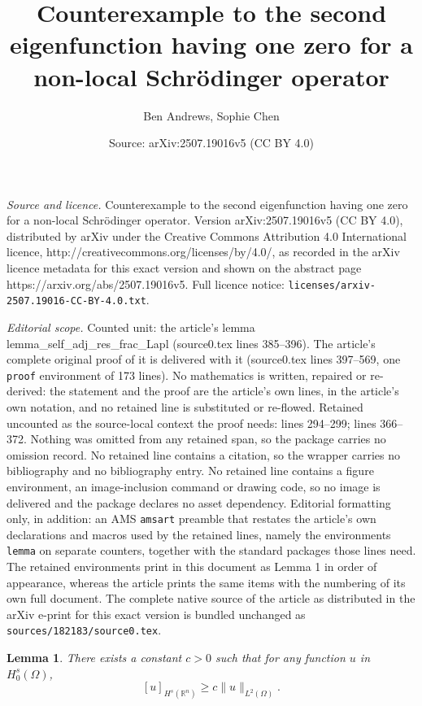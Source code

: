 \documentclass[10pt,a4paper]{amsart}
\title{Counterexample to the second eigenfunction having one zero for a non-local Schr\"{o}dinger operator}
\author{Ben Andrews, Sophie Chen}
\date{Source: arXiv:2507.19016v5 (CC BY 4.0)}
\newtheorem{lemma}{Lemma}
\newcommand{\R}{\mathbb R}
\begin{document}
\maketitle

\noindent\emph{Source and licence.} Counterexample to the second eigenfunction having one zero for a non-local Schr\"{o}dinger operator. Version arXiv:2507.19016v5 (CC BY 4.0), distributed by arXiv under the Creative Commons Attribution 4.0 International licence, http://creativecommons.org/licenses/by/4.0/, as recorded in the arXiv licence metadata for this exact version and shown on the abstract page https://arxiv.org/abs/2507.19016v5. Full licence notice: \texttt{licenses/arxiv-2507.19016-CC-BY-4.0.txt}.\par\smallskip

\noindent\textit{Editorial scope.} Counted unit: the article's lemma lemma\_self\_adj\_res\_frac\_Lapl (source0.tex lines 385--396). The article's complete original proof of it is delivered with it (source0.tex lines 397--569, one \texttt{proof} environment of 173 lines). No mathematics is written, repaired or re-derived: the statement and the proof are the article's own lines, in the article's own notation, and no retained line is substituted or re-flowed.  Retained uncounted as the source-local context the proof needs: lines 294--299; lines 366--372.  Nothing was omitted from any retained span, so the package carries no omission record.  No retained line contains a citation, so the wrapper carries no bibliography and no bibliography entry.  No retained line contains a figure environment, an image-inclusion command or drawing code, so no image is delivered and the package declares no asset dependency.  Editorial formatting only, in addition: an AMS \texttt{amsart} preamble that restates the article's own declarations and macros used by the retained lines, namely the environments \texttt{lemma} on separate counters, together with the standard packages those lines need.  The retained environments print in this document as Lemma 1 in order of appearance, whereas the article prints the same items with the numbering of its own full document.  The complete native source of the article as distributed in the arXiv e-print for this exact version is bundled unchanged as \texttt{sources/182183/source0.tex}.
\begin{lemma}\label{lem_equiv_norms} 
    There exists a constant $c>0$ such that for any function $u$ in $H^s_0(\Omega)$,
    \[
        [u]_{H^s(\R^n)}\geq c\|u\|_{L^2(\Omega)}.
    \] 
\end{lemma}
\end{document}
